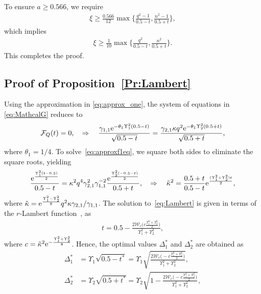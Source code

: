 \documentclass[journal,12pt,onecolumn,draftclsnofoot]{IEEEtran}
\theoremstyle{definition}
\begin{document}
To ensure $a \ge 0.566$, we require
\begin{align}
    \xi \geq \frac{0.566}{12} \max\Big\{\frac{q^2-1}{0.5-t}, \frac{n^2-1}{0.5+t} \Big\},  
\end{align}
which implies
\begin{align}
    \xi \geq \frac{1}{10} \max\Big\{\frac{q^2}{0.5-t}, \frac{n^2}{0.5+t} \Big\}. 
\end{align}
This completes the proof.

\subsection{Proof of Proposition~\ref{Pr:Lambert}}\label{sec:PrLambert}


Using the approximation in \eqref{eq:approx_one},  the system of equations in \eqref{eq:MathcalG} reduces to
\begin{align}
       \mathcal{F}_Q(t) = 0,\quad  \Rightarrow \quad 
      \frac{\gamma_{1,1}{\rm e}^{-\theta_{1} \Upsilon_1^2 (0.5-t)}}{\sqrt{0.5-t}}  = \frac{\gamma_{2,1}\kappa q^2{\rm e}^{-\theta_{1} \Upsilon_2^2 (0.5+t)}}{\sqrt{0.5+t}},
      \label{eq:approxf1eq}
\end{align}
where $\theta_1 = 1/4$. To solve~\eqref{eq:approxf1eq}, we square both sides to eliminate the square roots, yielding 
\begin{align}
      \frac{ {\rm e}^{ \frac{\Upsilon_1^2(t-0.5)}{2}} }{0.5-t} =\kappa^2 q^4\gamma_{2,1}^2\gamma_{1,1}^{-2} \frac{ {\rm e}^{ \frac{\Upsilon_2^2(-0.5-t)}{2}}}{0.5+t}, \quad \Rightarrow \quad
     \tilde{\kappa}^2  = \frac{ 0.5+t }{0.5-t}  {\rm e}^{ \frac{(\Upsilon_1^2+\Upsilon_2^2)t}{2}}, \label{eq:Lambert}
\end{align}
where $\tilde{\kappa} ={\rm e}^{\frac{\Upsilon_1^2-\Upsilon_2^2}{8}} q^2\kappa \gamma_{2,1}/\gamma_{1,1}$.  The solution to~\eqref{eq:Lambert} is given in terms of the $r$-Lambert function~\cite[Theorem~3]{mezHo2017generalization}, as
\begin{align}
    t = 0.5- \frac{2\mathcal{W}_{c}\Big(c \frac{\Upsilon_1^2+\Upsilon_2^2}{2} \Big)}{\Upsilon_1^2+\Upsilon_2^2},
\end{align}
where $c =\tilde{\kappa}^2 {\rm e}^{-\frac{\Upsilon_1^2+\Upsilon_2^2}{8}}$. 
Hence, the optimal values $\Delta_1^*$ and $\Delta_2^*$ are obtained as
\begin{subequations}
\label{eq:solution_lambert}
    \begin{align} 
    \Delta_1^* & = \Upsilon_1\sqrt{0.5-t^{*}}=\Upsilon_1\sqrt{  \frac{2\mathcal{W}_{c}\Big(-c \frac{\Upsilon_1^2+\Upsilon_2^2}{2} \Big)}{\Upsilon_1^2+\Upsilon_2^2}    }, \\
     \Delta_2^* & = \Upsilon_2\sqrt{0.5+t^{*}}=\Upsilon_2\sqrt{  1- \frac{ 2\mathcal{W}_{c}\Big(-c \frac{\Upsilon_1^2+\Upsilon_2^2}{2} \Big)}{\Upsilon_1^2+\Upsilon_2^2} }, 
\end{align}
\end{subequations}
\end{document}
